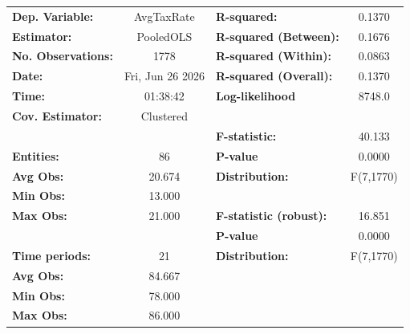 \begin{center}
\begin{tabular}{lclc}
\toprule
\textbf{Dep. Variable:}                       &     AvgTaxRate     & \textbf{  R-squared:         }   &      0.1370      \\
\textbf{Estimator:}                           &     PooledOLS      & \textbf{  R-squared (Between):}  &      0.1676      \\
\textbf{No. Observations:}                    &        1778        & \textbf{  R-squared (Within):}   &      0.0863      \\
\textbf{Date:}                                &  Fri, Jun 26 2026  & \textbf{  R-squared (Overall):}  &      0.1370      \\
\textbf{Time:}                                &      01:38:42      & \textbf{  Log-likelihood     }   &      8748.0      \\
\textbf{Cov. Estimator:}                      &     Clustered      & \textbf{                     }   &                  \\
\textbf{}                                     &                    & \textbf{  F-statistic:       }   &      40.133      \\
\textbf{Entities:}                            &         86         & \textbf{  P-value            }   &      0.0000      \\
\textbf{Avg Obs:}                             &       20.674       & \textbf{  Distribution:      }   &    F(7,1770)     \\
\textbf{Min Obs:}                             &       13.000       & \textbf{                     }   &                  \\
\textbf{Max Obs:}                             &       21.000       & \textbf{  F-statistic (robust):} &      16.851      \\
\textbf{}                                     &                    & \textbf{  P-value            }   &      0.0000      \\
\textbf{Time periods:}                        &         21         & \textbf{  Distribution:      }   &    F(7,1770)     \\
\textbf{Avg Obs:}                             &       84.667       & \textbf{                     }   &                  \\
\textbf{Min Obs:}                             &       78.000       & \textbf{                     }   &                  \\
\textbf{Max Obs:}                             &       86.000       & \textbf{                     }   &                  \\

\end{tabular}
\end{center}
